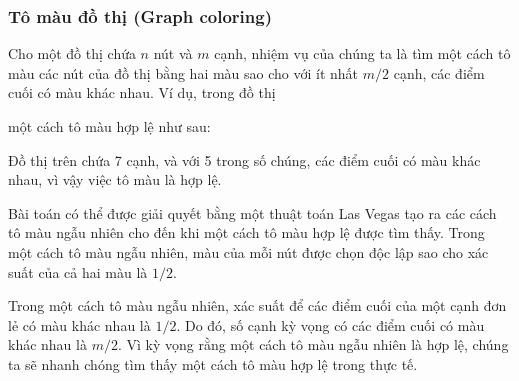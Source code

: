 \subsubsection{Tô màu đồ thị (Graph coloring)}


Cho một đồ thị chứa $n$ nút và $m$ cạnh,
nhiệm vụ của chúng ta là tìm một cách tô màu các nút
của đồ thị bằng hai màu sao cho
với ít nhất $m/2$ cạnh, các điểm cuối
có màu khác nhau.
Ví dụ, trong đồ thị
\begin{center}
\end{center}
một cách tô màu hợp lệ như sau:
\begin{center}
\end{center}
Đồ thị trên chứa 7 cạnh, và với 5 trong số chúng,
các điểm cuối có màu khác nhau,
vì vậy việc tô màu là hợp lệ.

Bài toán có thể được giải quyết bằng một thuật toán Las Vegas
tạo ra các cách tô màu ngẫu nhiên cho đến khi một cách tô màu hợp lệ
được tìm thấy.
Trong một cách tô màu ngẫu nhiên, màu của mỗi nút được
chọn độc lập sao cho xác suất của
cả hai màu là $1/2$.

Trong một cách tô màu ngẫu nhiên, xác suất để các điểm cuối
của một cạnh đơn lẻ có màu khác nhau là $1/2$.
Do đó, số cạnh kỳ vọng có các điểm cuối
có màu khác nhau là $m/2$.
Vì kỳ vọng rằng một cách tô màu ngẫu nhiên là hợp lệ,
chúng ta sẽ nhanh chóng tìm thấy một cách tô màu hợp lệ trong thực tế.